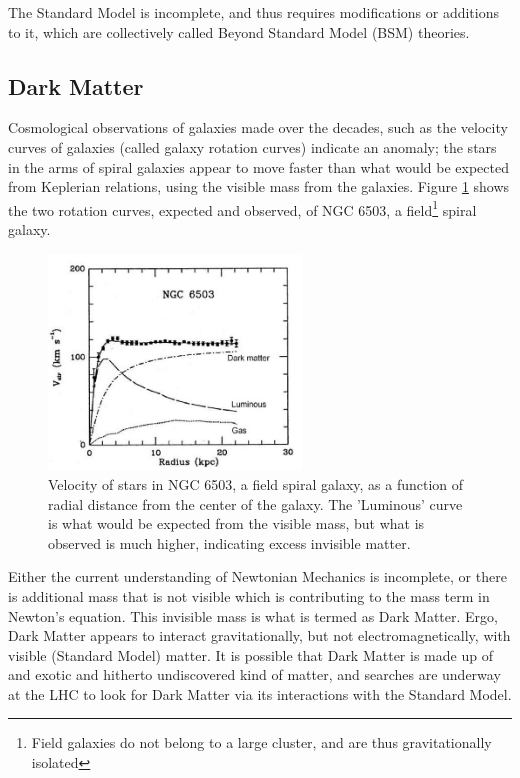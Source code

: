 \documentclass[12pt,a4paper,openright,twoside]{report}
\begin{document}
The Standard Model is incomplete, and thus requires modifications or additions to it, which are collectively called Beyond Standard Model (BSM) theories.
\vfill

\subsection{Dark Matter}
Cosmological observations of galaxies made over the decades, such as the velocity curves of galaxies (called galaxy rotation curves) indicate an anomaly; the stars in the arms of spiral galaxies appear to move faster than what would be expected from Keplerian relations, using the visible mass from the galaxies. Figure \ref{fig:grc} shows the two rotation curves, expected and observed, of NGC 6503, a field\footnote{Field galaxies do not belong to a large cluster, and are thus gravitationally isolated}  spiral galaxy.\cite{galaxy}
\begin{figure}[H]
\centering
	\includegraphics[width=0.6\textwidth]{GRC.jpeg}
	\caption{Velocity of stars in NGC 6503, a field spiral galaxy, as a function of radial distance from the center of the galaxy\cite{galaxy}. The 'Luminous' curve is what would be expected from the visible mass, but what is observed is much higher, indicating excess invisible matter.}
	\label{fig:grc}
\end{figure}
Either the current understanding of Newtonian Mechanics is incomplete, or there is additional mass that is not visible which is contributing to the mass term in Newton's equation. This invisible mass is what is termed as Dark Matter. Ergo, Dark Matter appears to interact gravitationally, but not electromagnetically, with visible (Standard Model) matter. It is possible that Dark Matter is made up of and exotic and hitherto undiscovered kind of matter, and searches are underway at the LHC to look for Dark Matter via its interactions with the Standard Model.
\end{document}
